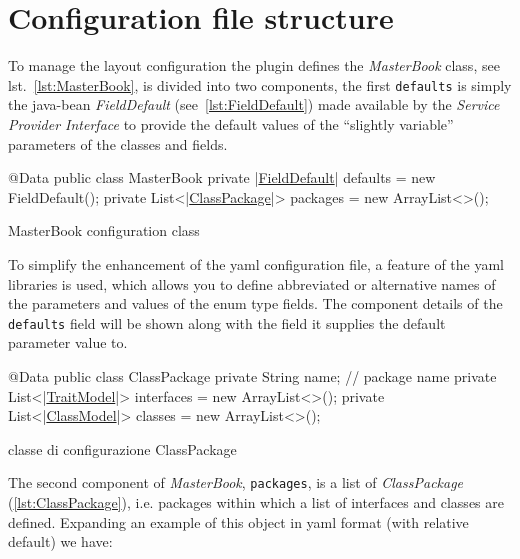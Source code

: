 \section{Configuration file structure}
To manage the layout configuration the plugin defines the \textsl{MasterBook} 
class, see lst.~\ref{lst:MasterBook}, is divided into two components, the first 
\texttt{defaults} is simply the java-bean \textsl{FieldDefault} 
(see~\ref{lst:FieldDefault}) made available by the 
\textsl{Service Provider Interface} to provide the default values of the 
``slightly variable'' parameters of the classes and fields.

\begin{elisting}[!htb]
\begin{javacode}
@Data
public class MasterBook {
    private |\hyperref[lst:FieldDefault]{FieldDefault}| defaults = new FieldDefault();
    private List<|\hyperref[lst:ClassPackage]{ClassPackage}|> packages = new ArrayList<>();
}
\end{javacode}
\caption{MasterBook configuration class}
\label{lst:MasterBook}
\end{elisting}

To simplify the enhancement of the yaml configuration file, a feature of the 
yaml libraries is used, which allows you to define abbreviated or alternative 
names of the parameters and values of the enum type fields. 
The component details of the \texttt{defaults} field will be shown along with 
the field it supplies the default parameter value to.

\begin{elisting}[!htb]
\begin{javacode}
@Data
public class ClassPackage {
    private String name;     // package name
    private List<|\hyperref[lst:TraitModel]{TraitModel}|> interfaces = new ArrayList<>();
    private List<|\hyperref[lst:ClassModel]{ClassModel}|> classes = new ArrayList<>();
}
\end{javacode}
\caption{classe di configurazione ClassPackage}
\label{lst:ClassPackage}
\end{elisting}
The second component of \textsl{MasterBook}, \texttt{packages}, is a list of 
\textsl{ClassPackage} (\ref{lst:ClassPackage}), i.e. packages within which a 
list of interfaces and classes are defined. 
Expanding an example of this object in yaml format (with relative default) 
we have:

